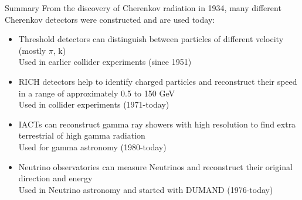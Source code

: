 \documentclass[aspectratio=1610, 10pt]{beamer}
\begin{document}
\begin{frame}{Summary}
From the discovery of Cherenkov radiation in 1934, many different Cherenkov detectors were constructed and are used today:
   \medskip
 \begin{itemize}
   \item Threshold detectors can distinguish between particles of different velocity (mostly $\pi$, k) \\
   \rightarrow Used in earlier collider experiments (since 1951)
   \medskip
   \item RICH detectors help to identify charged particles and reconstruct their speed in a range of approximately 0.5 to 150 GeV \\
   \rightarrow Used in collider experiments (1971-today)
   \medskip
   \item IACTs can reconstruct gamma ray showers with high resolution to find extra terrestrial of high gamma radiation \\
   \rightarrow Used for gamma astronomy (1980-today)
   \medskip
   \item Neutrino observatories can measure Neutrinos and reconstruct their original direction and energy \\
   \rightarrow Used in Neutrino astronomy and started with DUMAND (1976-today)
 \end{itemize}
\end{frame}
\end{document}
